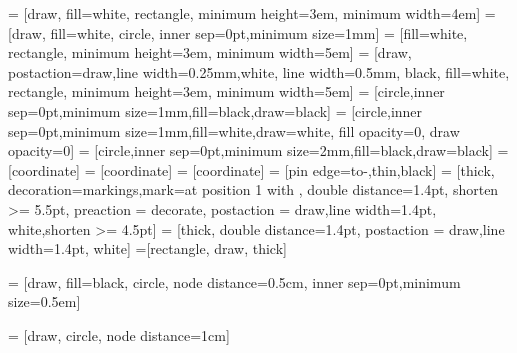  = [draw, fill=white, rectangle, minimum height=3em, minimum width=4em]
 = [draw, fill=white, circle, inner sep=0pt,minimum size=1mm]
 = [fill=white, rectangle, minimum height=3em, minimum width=5em]
 = [draw, postaction={draw,line width=0.25mm,white}, line width=0.5mm, black, fill=white, rectangle, minimum height=3em, minimum width=5em]
 = [circle,inner sep=0pt,minimum size=1mm,fill=black,draw=black]
 = [circle,inner sep=0pt,minimum size=1mm,fill=white,draw=white, fill opacity=0, draw opacity=0]
 = [circle,inner sep=0pt,minimum size=2mm,fill=black,draw=black]
 = [coordinate]
 = [coordinate] 
 = [coordinate] 
 = [pin edge={to-,thin,black}] 
 = [thick, decoration={markings,mark=at position
   1 with {}},
   double distance=1.4pt, shorten >= 5.5pt,
   preaction = {decorate},
   postaction = {draw,line width=1.4pt, white,shorten >= 4.5pt}]
 = [thick,
   double distance=1.4pt,
   postaction = {draw,line width=1.4pt, white}]
=[rectangle, draw, thick]

 = [draw, fill=black, circle, node distance=0.5cm, inner sep=0pt,minimum size=0.5em]

 = [draw, circle, node distance=1cm]